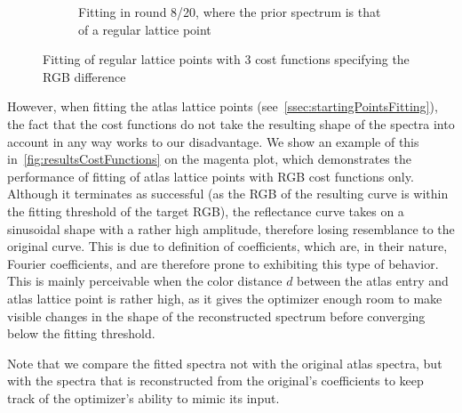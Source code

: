 \begin{figure}[t]
\begin{subfigure}[t]{0.45\textwidth}
		\caption{Fitting in round 8/20, where the prior spectrum is that of a regular lattice point}
		\label{fig:costFunctionsRegularRound8}
	\end{subfigure} 
	\caption{Fitting of regular lattice points with 3 cost functions specifying the RGB difference}
	\label{fig:costFunctionsRegularFitting}
\end{figure}

However, when fitting the atlas lattice points (see~\cref{ssec:startingPointsFitting}), the fact that the cost functions do not take the resulting shape of the spectra into account in any way works to our disadvantage. We show an example of this in~\cref{fig:resultsCostFunctions} on the magenta plot, which demonstrates the performance of fitting of atlas lattice points with RGB cost functions only. Although it terminates as successful (as the RGB of the resulting curve is within the fitting threshold of the target RGB), the reflectance curve takes on a sinusoidal shape with a rather high amplitude, therefore losing resemblance to the original curve. This is due to definition of coefficients, which are, in their nature, Fourier coefficients, and are therefore prone to exhibiting this type of behavior. This is mainly perceivable when the color distance $d$ between the atlas entry and atlas lattice point is rather high, as it gives the optimizer enough room to make visible changes in the shape of the reconstructed spectrum before converging below the fitting threshold.
 
Note that we compare the fitted spectra not with the original atlas spectra, but with the spectra that is reconstructed from the original's coefficients to keep track of the optimizer's ability to mimic its input.

